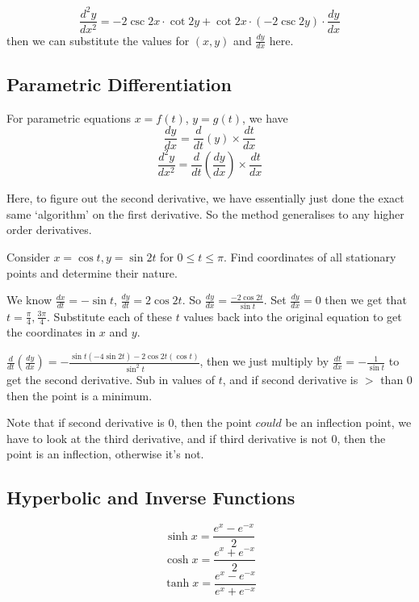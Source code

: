 \documentclass{article}
\newcommand{\f}[2]{\frac{#1}{#2}}
\theoremstyle{mytheoremstyle}
\theoremstyle{mytheoremstyle}
\theoremstyle{myproblemstyle}
\theoremstyle{myproblemstyle}
\begin{document}
    \[\f{d^2y}{dx^2} = -2\csc{2x}\cdot\cot{2y} + \cot{2x}\cdot (-2\csc{2y})\cdot\f{dy}{dx}\]
    then we can substitute the values for $(x, y)$ and $\f{dy}{dx}$ here.
  
    \subsection{Parametric Differentiation}
    \begin{theorem}[Formulae]
        For parametric equations $x = f(t)$, $y = g(t)$, we have
        \[\f{dy}{dx} = \f{d}{dt}(y) \times \f{dt}{dx}\]
        \[\f{d^2y}{dx^2} = \f{d}{dt}(\f{dy}{dx}) \times \f{dt}{dx}\]
    \end{theorem}
    Here, to figure out the second derivative, we have essentially just done the exact same `algorithm' on the first derivative. So the method generalises to any higher order derivatives.

    \begin{example}
        Consider $x = \cos{t}, y = \sin{2t}$ for $0\leq t \leq \pi$. Find coordinates of all stationary points and determine their nature.
    \end{example}

    We know $\f{dx}{dt} = -\sin{t}$, $\f{dy}{dt} = 2\cos{2t}$. So $\f{dy}{dx} = \f{-2\cos{2t}}{\sin{t}}$. Set $\f{dy}{dx} = 0$ then we get that $t = \f{\pi}{4}, \f{3\pi}{4}$. Substitute each of these $t$ values back into the original equation to get the coordinates in $x$ and $y$.

    $\f{d}{dt}(\frac{dy}{dx}) = -\f{\sin{t}(-4 \sin{2t}) - 2\cos{2t}(\cos{t})}{\sin^2{t}}$, then we just multiply by $\f{dt}{dx} = -\f{1}{\sin{t}}$ to get the second derivative. Sub in values of $t$, and if second derivative is $>$ than $0$ then the point is a minimum. 

    Note that if second derivative is $0$, then the point $\textit{could}$ be an inflection point, we have to look at the third derivative, and if third derivative is not $0$, then the point is an inflection, otherwise it's not.

    \subsection{Hyperbolic and Inverse Functions}
    \begin{definition}
        \[\sinh{x} = \frac{e^x - e^{-x}}{2}\]
        \[\cosh{x} = \frac{e^x + e^{-x}}{2}\]
        \[\tanh{x} = \frac{e^x - e^{-x}}{e^x + e^{-x}}\]
    \end{definition}
\end{document}
